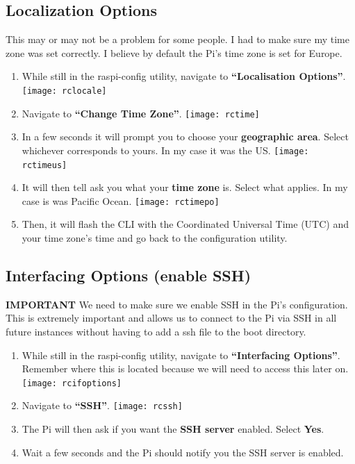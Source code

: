 \documentclass{article}
\begin{document}
\subsection{Localization Options}

This may or may not be a problem for some people. I had to make sure my time zone was set correctly. I believe by default the Pi's time zone is set for Europe.

\begin{enumerate}
  \item While still in the raspi-config utility, navigate to \textbf{``Localisation Options''}.
  \newline
  \newline
  \texttt{[image: rclocale]}
  \item Navigate to \textbf{``Change Time Zone''}.
  \newline
  \newline
  \texttt{[image: rctime]}
  \item In a few seconds it will prompt you to choose your \textbf{geographic area}. Select whichever corresponds to yours. In my case it was the US.
  \newline
  \newline
  \texttt{[image: rctimeus]}
  \item It will then tell ask you what  your \textbf{time zone} is. Select what applies. In my case is was Pacific Ocean.
  \newline
  \newline
  \texttt{[image: rctimepo]}
  \item Then, it will flash the CLI with the Coordinated Universal Time (UTC) and your time zone's time and go back to the configuration utility.
\end{enumerate}

\subsection{Interfacing Options (enable SSH)}

\textbf{IMPORTANT} We need to make sure we enable SSH in the Pi's configuration. This is extremely important and allows us to connect to the Pi via SSH in all future instances without having to add a ssh file to the boot directory.

\begin{enumerate}
  \item While still in the raspi-config utility, navigate to \textbf{``Interfacing Options''}. Remember where this is located because we will need to access this later on.
  \newline
  \newline
  \texttt{[image: rcifoptions]}
  \item Navigate to \textbf{``SSH''}.
  \newline
  \newline
  \texttt{[image: rcssh]}
  \item The Pi will then ask if you want the \textbf{SSH server} enabled. Select \textbf{Yes}.
  \item Wait a few seconds and the Pi should notify you the SSH server is enabled.
\end{enumerate}
\end{document}
